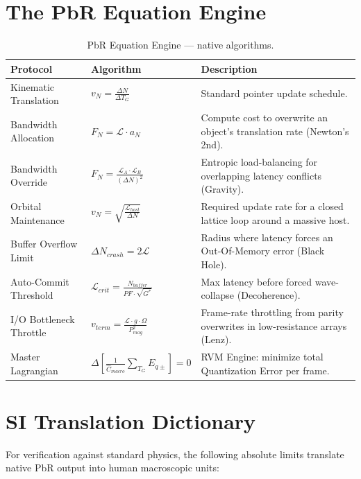 \documentclass[12pt, a4paper]{article}
\begin{document}
\section{The PbR Equation Engine}

\begin{table}[h!]
\centering
\small
\begin{tabular}{@{}lL{3.2cm}L{5.2cm}@{}}
\toprule
\textbf{Protocol} & \textbf{Algorithm} & \textbf{Description} \\
\midrule
Kinematic Translation & $v_N = \frac{\Delta N}{\Delta T_G}$ & Standard pointer update schedule. \\[6pt]
Bandwidth Allocation & $F_N = \mathcal{L} \cdot a_N$ & Compute cost to overwrite an object's translation rate (Newton's 2nd). \\[6pt]
Bandwidth Override & $F_N = \frac{\mathcal{L}_A \cdot \mathcal{L}_B}{(\Delta N)^2}$ & Entropic load-balancing for overlapping latency conflicts (Gravity). \\[6pt]
Orbital Maintenance & $v_N = \sqrt{\frac{\mathcal{L}_{host}}{\Delta N}}$ & Required update rate for a closed lattice loop around a massive host. \\[6pt]
Buffer Overflow Limit & $\Delta N_{crash} = 2\mathcal{L}$ & Radius where latency forces an Out-Of-Memory error (Black Hole). \\[6pt]
Auto-Commit Threshold & $\mathcal{L}_{crit} = \frac{N_{buffer}}{PF \cdot \sqrt{G^*}}$ & Max latency before forced wave-collapse (Decoherence). \\[6pt]
I/O Bottleneck Throttle & $v_{term} = \frac{\mathcal{L} \cdot g \cdot \Omega}{P_{mag}^2}$ & Frame-rate throttling from parity overwrites in low-resistance arrays (Lenz). \\[6pt]
Master Lagrangian & $\Delta\!\left[\frac{1}{\hat{C}_{macro}}\sum_{T_G} E_{q\pm}\right] = 0$ & RVM Engine: minimize total Quantization Error per frame. \\
\bottomrule
\end{tabular}
\caption{PbR Equation Engine --- native algorithms.}
\end{table}

\section{SI Translation Dictionary}

For verification against standard physics, the following absolute limits translate native PbR output into human macroscopic units:
\end{document}
